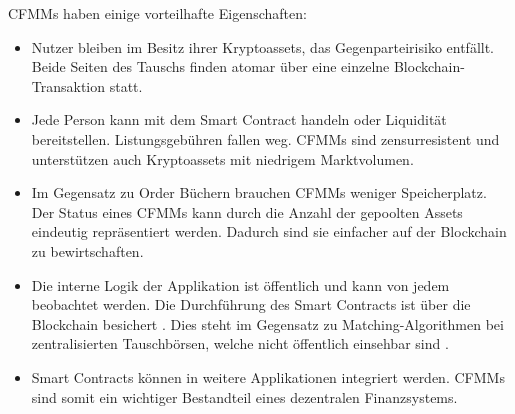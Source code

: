 \documentclass[12pt,a4paper,titlepage,oneside,english]{article}
\begin{document}
CFMMs haben einige vorteilhafte Eigenschaften: 
\begin{itemize}
	\item Nutzer bleiben im Besitz ihrer Kryptoassets, das Gegenparteirisiko entfällt. Beide Seiten des Tauschs finden atomar 			über eine einzelne Blockchain-Transaktion statt. \citep[vgl.][S.8]{Schaer2020}
	\item Jede Person kann mit dem Smart Contract handeln oder Liquidität bereitstellen. Listungsgebühren fallen weg. CFMMs sind zensurresistent und unterstützen auch Kryptoassets mit niedrigem Marktvolumen. \citep[vgl.][]{Joel2020}
	\item Im Gegensatz zu Order Büchern brauchen CFMMs weniger Speicherplatz. Der Status eines CFMMs kann durch die Anzahl der 			gepoolten Assets eindeutig repräsentiert werden. Dadurch sind sie einfacher auf der Blockchain zu bewirtschaften. \citep[vgl.][S.3]{Angeris2019}
	\item Die interne Logik der Applikation ist öffentlich und kann von jedem beobachtet werden. Die Durchführung des Smart Contracts ist über die Blockchain besichert \citep[S.2]{Schaer2020}. Dies steht im Gegensatz zu Matching-Algorithmen bei zentralisierten Tauschbörsen, welche nicht öffentlich einsehbar sind \citep[S.3]{Angeris2019}.
	\item Smart Contracts können in weitere Applikationen integriert werden. CFMMs sind somit ein wichtiger Bestandteil eines dezentralen Finanzsystems. \citep[vgl.][S.4]{Schaer2020}
\end{itemize}
\end{document}
